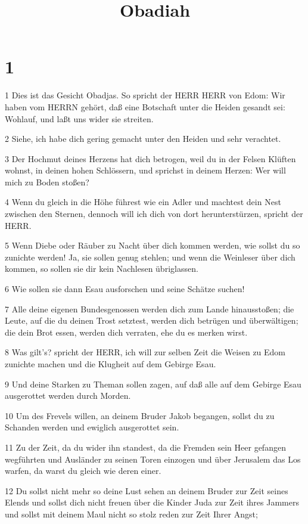 

\title{Obadiah}


\chapter{1}

\par 1 Dies ist das Gesicht Obadjas. So spricht der HERR HERR von Edom: Wir haben vom HERRN gehört, daß eine Botschaft unter die Heiden gesandt sei: Wohlauf, und laßt uns wider sie streiten.
\par 2 Siehe, ich habe dich gering gemacht unter den Heiden und sehr verachtet.
\par 3 Der Hochmut deines Herzens hat dich betrogen, weil du in der Felsen Klüften wohnst, in deinen hohen Schlössern, und sprichst in deinem Herzen: Wer will mich zu Boden stoßen?
\par 4 Wenn du gleich in die Höhe führest wie ein Adler und machtest dein Nest zwischen den Sternen, dennoch will ich dich von dort herunterstürzen, spricht der HERR.
\par 5 Wenn Diebe oder Räuber zu Nacht über dich kommen werden, wie sollst du so zunichte werden! Ja, sie sollen genug stehlen; und wenn die Weinleser über dich kommen, so sollen sie dir kein Nachlesen übriglassen.
\par 6 Wie sollen sie dann Esau ausforschen und seine Schätze suchen!
\par 7 Alle deine eigenen Bundesgenossen werden dich zum Lande hinausstoßen; die Leute, auf die du deinen Trost setztest, werden dich betrügen und überwältigen; die dein Brot essen, werden dich verraten, ehe du es merken wirst.
\par 8 Was gilt's? spricht der HERR, ich will zur selben Zeit die Weisen zu Edom zunichte machen und die Klugheit auf dem Gebirge Esau.
\par 9 Und deine Starken zu Theman sollen zagen, auf daß alle auf dem Gebirge Esau ausgerottet werden durch Morden.
\par 10 Um des Frevels willen, an deinem Bruder Jakob begangen, sollst du zu Schanden werden und ewiglich ausgerottet sein.
\par 11 Zu der Zeit, da du wider ihn standest, da die Fremden sein Heer gefangen wegführten und Ausländer zu seinen Toren einzogen und über Jerusalem das Los warfen, da warst du gleich wie deren einer.
\par 12 Du sollst nicht mehr so deine Lust sehen an deinem Bruder zur Zeit seines Elends und sollst dich nicht freuen über die Kinder Juda zur Zeit ihres Jammers und sollst mit deinem Maul nicht so stolz reden zur Zeit Ihrer Angst;
